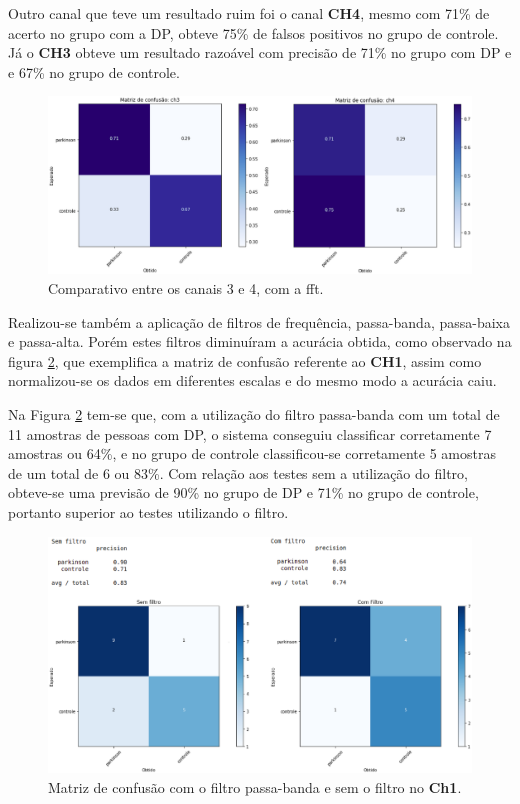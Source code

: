 Outro canal que teve um resultado ruim foi o canal \textbf{CH4}, mesmo com 71\% de acerto no grupo com a DP, obteve 75\% de falsos positivos no grupo de controle. Já o \textbf{CH3} obteve um resultado razoável com precisão de 71\% no grupo com DP e e 67\% no grupo de controle.

\begin{figure}[!t]
    \centering
    \includegraphics[width=1.1\textwidth]{figuras/CH34Comp.eps}
    \caption{Comparativo entre os canais 3 e 4, com a fft.}
    \label{fcomparativo3}
\end{figure}


Realizou-se também a aplicação de filtros de frequência, passa-banda, passa-baixa e passa-alta. Porém estes filtros diminuíram a acurácia obtida, como observado na figura \ref{comesemfiltro}, que exemplifica a matriz de confusão referente ao \textbf{CH1}, assim como normalizou-se os dados em diferentes escalas e do mesmo modo a acurácia caiu. 

Na Figura \ref{comesemfiltro} tem-se que, com a utilização do filtro passa-banda com um total de 11 amostras de pessoas com DP, o sistema conseguiu classificar corretamente 7 amostras ou 64\%, e no grupo de controle classificou-se corretamente 5 amostras de um total de 6 ou 83\%. Com relação aos testes sem a utilização do filtro, obteve-se uma previsão de 90\% no grupo de DP e 71\% no grupo de controle, portanto superior ao testes utilizando o filtro.


\begin{figure}[t]
    \centering
    \includegraphics[width=1\textwidth]{figuras/filtroComp.eps}
    \caption{Matriz de confusão com o filtro passa-banda e sem o filtro no \textbf{Ch1}.}
    \label{comesemfiltro}
\end{figure}

